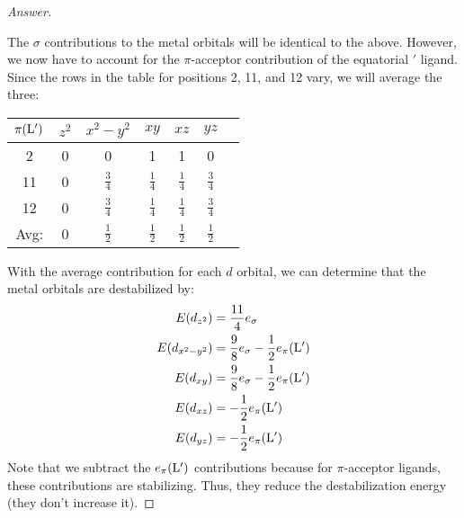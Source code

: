 \documentclass[../psets.tex]{subfiles}
\begin{document}
\begin{enumerate}[label={\Roman*)}]
\begin{enumerate}[label={\textbf{10.\arabic*}}]
\begin{enumerate}[label={\textbf{\alph*.}}]
\begin{enumerate}[label={(\arabic*)}]
\begin{proof}[Answer]
\begin{center}
                    \end{center}
                    \vspace{1em}
                    The $\sigma$ contributions to the metal orbitals will be identical to the above. However, we now have to account for the $\pi$-acceptor contribution of the equatorial $'$ ligand. Since the rows in the table for positions 2, 11, and 12 vary, we will average the three:
                    \begin{center}
                        \small
                        \renewcommand{\arraystretch}{1.4}
                        \begin{tabular}{c|cccccc}
                            $\pi(\ce{L}')$ & $z^2$ & $x^2-y^2$ & $xy$ & $xz$ & $yz$\\
                            \hline
                            2 & 0 & 0 & 1 & 1 & 0\\
                            11 & 0 & $\frac{3}{4}$ & $\frac{1}{4}$ & $\frac{1}{4}$ & $\frac{3}{4}$\\
                            12 & 0 & $\frac{3}{4}$ & $\frac{1}{4}$ & $\frac{1}{4}$ & $\frac{3}{4}$\\
                            \hline
                            Avg: & 0 & $\frac{1}{2}$ & $\frac{1}{2}$ & $\frac{1}{2}$ & $\frac{1}{2}$\\
                        \end{tabular}
                    \end{center}
                    With the average contribution for each $d$ orbital, we can determine that the metal orbitals are destabilized by:
                    \begin{align*}
                        E(d_{z^2}) &= \frac{11}{4}e_\sigma\\
                        E(d_{x^2-y^2}) &= \frac{9}{8}e_\sigma-\frac{1}{2}e_\pi(\ce{L}')\\
                        E(d_{xy}) &= \frac{9}{8}e_\sigma-\frac{1}{2}e_\pi(\ce{L}')\\
                        E(d_{xz}) &= -\frac{1}{2}e_\pi(\ce{L}')\\
                        E(d_{yz}) &= -\frac{1}{2}e_\pi(\ce{L}')
                    \end{align*}
                    Note that we subtract the $e_\pi(\ce{L}')$ contributions because for $\pi$-acceptor ligands, these contributions are stabilizing. Thus, they reduce the destabilization energy (they don't increase it).
                \end{proof}

\end{enumerate}
\end{enumerate}
\end{enumerate}
\end{enumerate}
\end{document}
